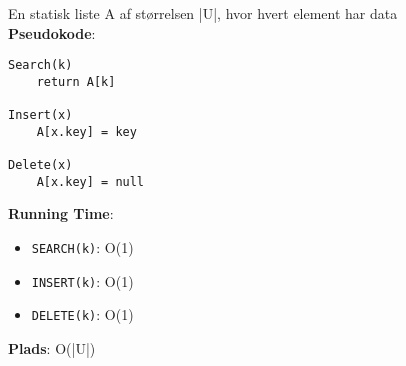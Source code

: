 En statisk liste A af størrelsen |U|, hvor hvert element har data\\
\textbf{Pseudokode}:
\begin{lstlisting}[frame=single, mathescape=true]
Search(k)
	return A[k]

Insert(x)
	A[x.key] = key

Delete(x)
	A[x.key] = null
\end{lstlisting}
\textbf{Running Time}:
\begin{itemize}
	\item \texttt{SEARCH(k)}: O(1)
	\item \texttt{INSERT(k)}: O(1)
	\item \texttt{DELETE(k)}: O(1)
\end{itemize}
\textbf{Plads}: O(|U|)